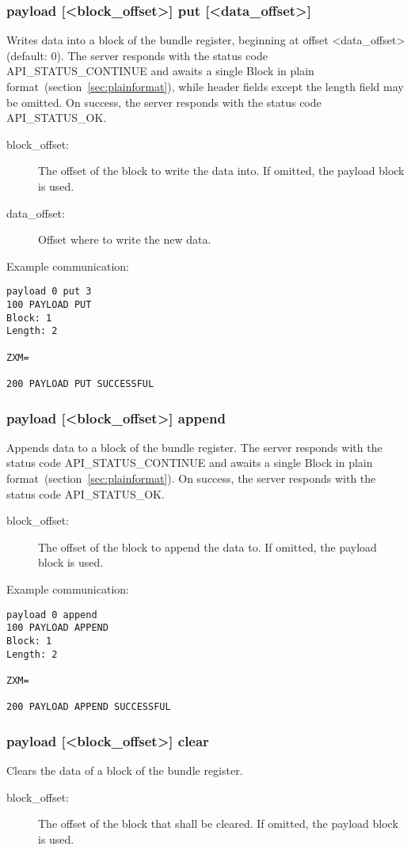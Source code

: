 \documentclass[12pt, a4paper]{scrartcl}
\begin{document}
\subsubsection*{payload [<block\_offset>] put [<data\_offset>]}
Writes data into a block of the bundle register, beginning at offset <data\_offset> (default: 0).
The server responds with the status code API\_STATUS\_CONTINUE and awaits a single Block in plain format~(section~\ref{sec:plainformat}), while header fields except the length field  may be omitted.
On success, the server responds with the status code API\_STATUS\_OK.
\begin{description}
\item[block\_offset:] The offset of the block to write the data into.
	If omitted, the payload block is used.
\item[data\_offset:] Offset where to write the new data.
\end{description}
Example communication:\\
\makebox[\textwidth]{\hrulefill}
\begin{verbatim}
payload 0 put 3
100 PAYLOAD PUT
Block: 1
Length: 2

ZXM=

200 PAYLOAD PUT SUCCESSFUL
\end{verbatim}
\makebox[\textwidth]{\hrulefill}
\subsubsection*{payload [<block\_offset>] append}
Appends data to a block of the bundle register.
The server responds with the status code API\_STATUS\_CONTINUE and awaits a single Block in plain format~(section~\ref{sec:plainformat}).
On success, the server responds with the status code API\_STATUS\_OK.

\begin{description}
\item[block\_offset:] The offset of the block to append the data to.
	If omitted, the payload block is used.
\end{description}
Example communication:\\
\makebox[\textwidth]{\hrulefill}
\begin{verbatim}
payload 0 append
100 PAYLOAD APPEND
Block: 1
Length: 2

ZXM=

200 PAYLOAD APPEND SUCCESSFUL
\end{verbatim}
\makebox[\textwidth]{\hrulefill}
\subsubsection*{payload [<block\_offset>] clear}
Clears the data of a block of the bundle register.
\begin{description}
\item[block\_offset:] The offset of the block that shall be cleared.
	If omitted, the payload block is used.
\end{description}
\end{document}
